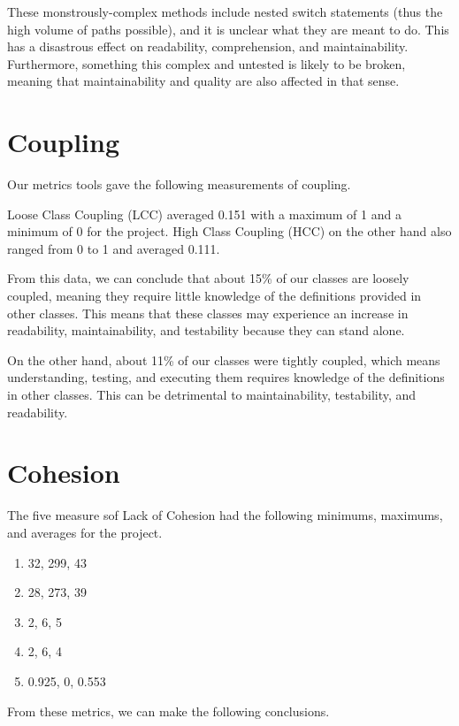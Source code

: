 \documentclass[12pt,a4paper,titlepage]{article}
\begin{document}
These monstrously-complex methods include nested switch statements (thus the high volume of 
paths possible), and it is unclear what they are meant to do. This has a disastrous effect 
on readability, comprehension, and maintainability. Furthermore, something this complex 
and untested is likely to be broken, meaning that maintainability and quality are also 
affected in that sense.

\section{Coupling}
Our metrics tools gave the following measurements of coupling.

Loose Class Coupling (LCC) averaged 0.151 with a maximum of 1 and a minimum of 0 for the project.
High Class Coupling (HCC) on the other hand also ranged from 0 to 1 and averaged 0.111.

From this data, we can conclude that about 15\% of our classes are loosely coupled, 
meaning they require little knowledge of the definitions provided in other classes. 
This means that these classes may experience an increase in readability, maintainability, 
and testability because they can stand alone.

On the other hand, about 11\% of our classes were tightly coupled, which means understanding, 
testing, and executing them requires knowledge of the definitions in other classes. This can 
be detrimental to maintainability, testability, and readability.

\section{Cohesion}
The five measure sof Lack of Cohesion had the following minimums, maximums, and averages for 
the project.

\begin{enumerate}
\item 32, 299, 43
\item 28, 273, 39
\item 2, 6, 5
\item 2, 6, 4
\item 0.925, 0, 0.553
\end{enumerate}

From these metrics, we can make the following conclusions.
\end{document}

